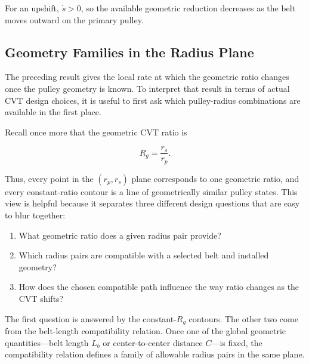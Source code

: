\documentclass[11pt]{report}
\begin{document}

For an upshift, \(\dot s>0\), so the available geometric reduction decreases as
the belt moves outward on the primary pulley.


\subsection{Geometry Families in the Radius Plane}
\label{sec:ratio-plane-geometry-families}

The preceding result gives the local rate at which the geometric ratio changes
once the pulley geometry is known. To interpret that result in terms of actual
CVT design choices, it is useful to first ask which pulley-radius combinations
are available in the first place.

Recall once more that the geometric CVT ratio is

\begin{equation}
R_g=\frac{r_s}{r_p}.
\label{eq:geometric-ratio-radius-plane}
\end{equation}

Thus, every point in the \((r_p,r_s)\) plane corresponds to one geometric
ratio, and every constant-ratio contour is a line of geometrically similar
pulley states. This view is helpful because it separates three
different design questions that are easy to blur together:

\begin{enumerate}
    \item What geometric ratio does a given radius pair provide?
    \item Which radius pairs are compatible with a selected belt and installed
    geometry?
    \item How does the chosen compatible path influence the way ratio changes as
    the CVT shifts?
\end{enumerate}

The first question is answered by the constant-\(R_g\) contours. The other two
come from the belt-length compatibility relation. Once one of the global
geometric quantities---belt length \(L_b\) or center-to-center distance
\(C\)---is fixed, the compatibility relation defines a family of allowable
radius pairs in the same plane.
\end{document}
